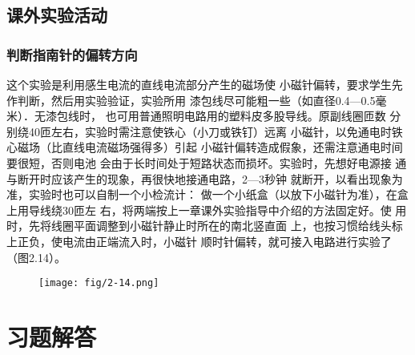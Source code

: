 \subsection{课外实验活动}
\subsubsection{判断指南针的偏转方向}
这个实验是利用感生电流的直线电流部分产生的磁场使
小磁针偏转，要求学生先作判断，然后用实验验证，实验所用
漆包线尽可能粗一些（如直径0.4—0.5毫米）．无漆包线时，
也可用普通照明电路用的塑料皮多股导线。原副线圈匝数
分别绕40匝左右，实验时需注意使铁心（小刀或铁钉）远离
小磁针，以免通电时铁心磁场（比直线电流磁场强得多）引起
小磁针偏转造成假象，还需注意通电时间要很短，否则电池
会由于长时间处于短路状态而损坏。实验时，先想好电源接
通与断开时应该产生的现象，再很快地接通电路，2—3秒钟
就断开，以看出现象为准，实验时也可以自制一个小检流计：
做一个小纸盒（以放下小磁针为准），在盒上用导线绕30匝左
右，将两端按上一章课外实验指导中介绍的方法固定好。使
用时，先将线圈平面调整到小磁针静止时所在的南北竖直面
上，也按习惯给线头标上正负，使电流由正端流入时，小磁针
顺时针偏转，就可接入电路进行实验了（图2.14）。
\begin{figure}[htp]
    \centering
\texttt{[image: fig/2-14.png]}
    \caption{}
\end{figure}


\section{习题解答}

